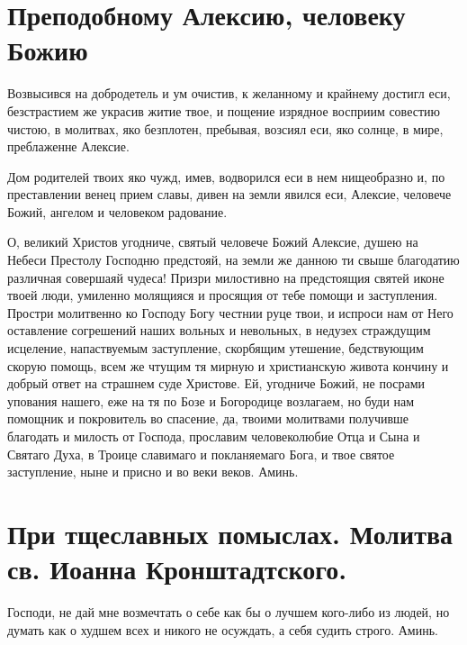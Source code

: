 \mychapterending


\section{Преподобному Алексию, человеку Божию}\begin{mymulticols}


Возвысився на добродетель и ум очистив, к желанному и крайнему достигл еси, безстрастием же украсив житие твое, и пощение изрядное восприим совестию чистою, в молитвах, яко безплотен, пребывая, возсиял еси, яко солнце, в мире, преблаженне Алексие.


Дом родителей твоих яко чужд, имев, водворился еси в нем нищеобразно и, по преставлении венец прием славы, дивен на земли явился еси, Алексие, человече Божий, ангелом и человеком радование.


О, великий Христов угодниче, святый человече Божий Алексие, душею на Небеси Престолу Господню предстояй, на земли же данною ти свыше благодатию различная совершаяй чудеса! Призри милостивно на предстоящия святей иконе твоей люди, умиленно молящияся и просящия от тебе помощи и заступления. Простри молитвенно ко Господу Богу честнии руце твои, и испроси нам от Него оставление согрешений наших вольных и невольных, в недузех страждущим исцеление, напаствуемым заступление, скорбящим утешение, бедствующим скорую помощь, всем же чтущим тя мирную и христианскую живота кончину и добрый ответ на страшнем суде Христове. Ей, угодниче Божий, не посрами упования нашего, еже на тя по Бозе и Богородице возлагаем, но буди нам помощник и покровитель во спасение, да, твоими молитвами получивше благодать и милость от Господа, прославим человеколюбие Отца и Сына и Святаго Духа, в Троице славимаго и покланяемаго Бога, и твое святое заступление, ныне и присно и во веки веков. Аминь.

\end{mymulticols}

\section{При тщеславных помыслах. Молитва св. Иоанна Кронштадтского.}\begin{mymulticols}

Господи, не дай мне возмечтать о себе как бы о лучшем кого-либо из людей, но думать как о худшем всех и никого не осуждать, а себя судить строго. Аминь.

\end{mymulticols}

